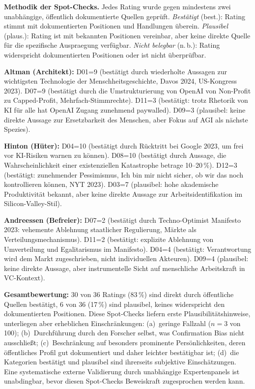 \documentclass[12pt,a4paper]{article}
\begin{document}
\noindent\textbf{Methodik der Spot-Checks.} Jedes Rating wurde gegen mindestens zwei unabh\"angige, \"offentlich dokumentierte Quellen gepr\"uft. \emph{Best\"atigt} (best.): Rating stimmt mit dokumentierten Positionen und Handlungen \"uberein. \emph{Plausibel} (plaus.): Rating ist mit bekannten Positionen vereinbar, aber keine direkte Quelle f\"ur die spezifische Ausprae\-gung verf\"ugbar. \emph{Nicht belegbar} (n.\,b.): Rating widerspricht dokumentierten Positionen oder ist nicht \"uberpr\"ufbar.

\textbf{Altman (Architekt):} D01=9 (best\"atigt durch wiederholte Aussagen zur \glqq wichtigsten Technologie der Menschheitsgeschichte\grqq, Davos 2024, US-Kongress 2023). D07=9 (best\"atigt durch die Umstrukturierung von OpenAI von Non-Profit zu Capped-Profit, Mehrfach-Stimmrechte). D11=3 (best\"atigt: trotz Rhetorik von \glqq KI f\"ur alle\grqq{} hat OpenAI Zugang zunehmend paywalled). D09=3 (plausibel: keine direkte Aussage zur Ersetzbarkeit des Menschen, aber Fokus auf AGI als \glqq n\"achste Spezies\grqq).

\textbf{Hinton (H\"uter):} D04=10 (best\"atigt durch R\"ucktritt bei Google 2023, um frei vor KI-Risiken warnen zu k\"onnen). D08=10 (best\"atigt durch Aussage, die Wahrscheinlichkeit einer existenziellen Katastrophe betrage 10--20\,\%). D12=3 (best\"atigt: zunehmender Pessimismus, \glqq Ich bin mir nicht sicher, ob wir das noch kontrollieren k\"onnen\grqq, NYT 2023). D03=7 (plausibel: hohe akademische Produktivit\"at bekannt, aber keine direkte Aussage zur Arbeitsidentifikation im Silicon-Valley-Stil).

\textbf{Andreessen (Befreier):} D07=2 (best\"atigt durch \glqq Techno-Optimist Manifesto\grqq{} 2023: vehemente Ablehnung staatlicher Regulierung, M\"arkte als Verteilungsmechanismus). D11=2 (best\"atigt: explizite Ablehnung von Umverteilung und Egalitarismus im Manifesto). D04=4 (best\"atigt: Verantwortung wird dem Markt zugeschrieben, nicht individuellen Akteuren). D09=4 (plausibel: keine direkte Aussage, aber instrumentelle Sicht auf menschliche Arbeitskraft in VC-Kontext).

\textbf{Gesamtbewertung:} 30 von 36 Ratings (83\,\%) sind direkt durch \"offentliche Quellen best\"atigt, 6 von 36 (17\,\%) sind plausibel, keines widerspricht den dokumentierten Positionen. Diese Spot-Checks liefern erste Plausibilit\"atshinweise, unterliegen aber erheblichen Einschr\"ankungen: (a)~geringe Fallzahl ($n=3$ von 100); (b)~Durchf\"uhrung durch den Forscher selbst, was Confirmation Bias nicht ausschlie\ss{}t; (c)~Beschr\"ankung auf besonders prominente Pers\"onlichkeiten, deren \"offentliches Profil gut dokumentiert und daher leichter \glqq best\"atigbar\grqq{} ist; (d)~die Kategorien \glqq best\"atigt\grqq{} und \glqq plausibel\grqq{} sind ihrerseits subjektive Einsch\"atzungen. Eine systematische externe Validierung durch unabh\"angige Expertenpanels ist unabdingbar, bevor diesen Spot-Checks Beweiskraft zugesprochen werden kann.
\end{document}
